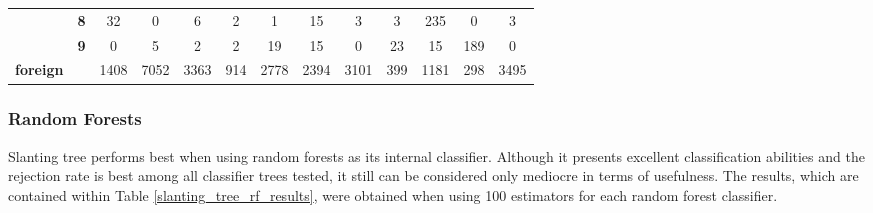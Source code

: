 \begin{table}[htp]
\begin{tabular}{|c|c|c|c|c|c|c|c|c|c|c|c|c|}
		& \textbf{8} & 32         & 0          & 6          & 2          & 1          & 15         & 3          & 3          & 235        & 0          & 3                \\ \cline{2-13} 
		& \textbf{9} & 0          & 5          & 2          & 2          & 19         & 15         & 0          & 23         & 15         & 189        & 0                \\ \hline
		\textbf{foreign}                    & \textbf{}  & 1408       & 7052       & 3363       & 914        & 2778       & 2394       & 3101       & 399        & 1181       & 298        & 3495             \\ \hline
	\end{tabular}
\end{table}

\subsubsection{Random Forests}

Slanting tree performs best when using random forests as its internal classifier. Although it presents excellent classification abilities and the rejection rate is best among all classifier trees tested, it still can be considered only mediocre in terms of usefulness. The results, which are contained within Table \ref{slanting_tree_rf_results}, were obtained when using 100 estimators for each random forest classifier.

